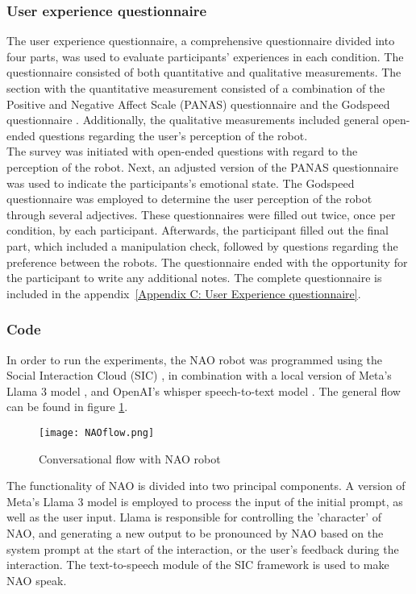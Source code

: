 \documentclass[runningheads]{llncs}
\begin{document}
\subsubsection{User experience questionnaire}
The user experience questionnaire, a comprehensive questionnaire divided into four parts, was used to evaluate participants' experiences in each condition. The questionnaire consisted of both quantitative and qualitative measurements. The section with the quantitative measurement consisted of a combination of the Positive and Negative Affect Scale (PANAS) questionnaire \cite{Watson1988} and the Godspeed questionnaire \cite{Bartneck2009}. Additionally, the qualitative measurements included general open-ended questions regarding the user's perception of the robot. \\

The survey was initiated with open-ended questions with regard to the perception of the robot. Next, an adjusted version of the PANAS questionnaire \cite{Watson1988} was used to indicate the participants's emotional state. The Godspeed questionnaire \cite{Bartneck2009} was employed to determine the user perception of the robot through several adjectives. These questionnaires were filled out twice, once per condition, by each participant. Afterwards, the participant filled out the final part, which included a manipulation check, followed by questions regarding the preference between the robots. The questionnaire ended with the opportunity for the participant to write any additional notes. The complete questionnaire is included in the appendix~\ref{Appendix C: User Experience questionnaire}.

\subsubsection{Code}
In order to run the experiments, the NAO robot was programmed using the Social Interaction Cloud (SIC) \cite{SIC}, in combination with a local version of Meta's Llama 3 model \cite{Llama2024}, and OpenAI's whisper speech-to-text model \cite{whisper}. The general flow can be found in figure \ref{fig:conversation flow}.\\

\begin{figure}
    \centering
    \texttt{[image: NAOflow.png]}
    \caption{Conversational flow with NAO robot}
    \label{fig:conversation flow}
\end{figure}

The functionality of NAO is divided into two principal components. A version of Meta's Llama 3 model is employed to process the input of the initial prompt, as well as the user input. Llama is responsible for controlling the 'character' of NAO, and generating a new output to be pronounced by NAO based on the system prompt at the start of the interaction, or the user's feedback during the interaction. The text-to-speech module of the SIC framework is used to make NAO speak. \\
\end{document}
